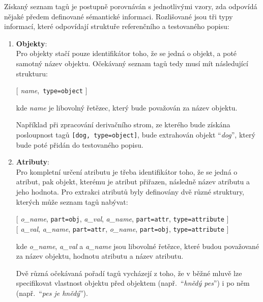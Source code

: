 Získaný seznam tagů je postupně porovnáván s jednotlivými vzory, zda odpovídá nějaké předem definované sémantické informaci.
Rozlišované jsou tři typy informací, které odpovídají struktuře referenčního a testovaného popisu:
\begin{enumerate}
	\item \textbf{Objekty}: \\
	      Pro objekty stačí pouze identifikátor toho, že se jedná o objekt, a poté samotný název objektu.
	      Očekávaný seznam tagů tedy musí mít následující strukturu:
	      \begin{center}
		      $\bigl[ $ \emph{name},\ {\texttt{type=object}} $\bigr]$
	      \end{center}
	      kde \emph{name} je libovolný řetězec, který bude považován za název objektu.

	      Například při zpracování derivačního strom, ze kterého bude získána posloupnost tagů
	      \texttt{[dog, type=object]},
	      bude extrahován objekt \enquote{\emph{dog}}, který bude poté přidán do testovaného popisu.
	\item \textbf{Atributy}: \\
	      Pro kompletní určení atributu je třeba identifikátor toho, že se jedná o atribut,
	      pak objekt, kterému je atribut přiřazen, následně název atributu a jeho hodnota.
	      Pro extrakci atributů byly definovány dvě různé struktury, kterých může seznam tagů nabývat:
	      \begin{center}
		      $\bigl[$ \emph{o\_name}, {\texttt{part=obj}}, \emph{a\_val}, \emph{a\_name},
					      {\texttt{part=attr}}, {\texttt{type=attribute}} $\bigr]$ \\
		      $\bigl[$ \emph{a\_val}, \emph{a\_name}, {\texttt{part=attr}}, \emph{o\_name},
					      {\texttt{part=obj}}, {\texttt{type=attribute}} $\bigr]$
	      \end{center}
	      kde \emph{o\_name}, \emph{a\_val} a \emph{a\_name} jsou libovolné řetězce, které budou považované za název objektu,
	      hodnotu atributu a název atributu.

	      Dvě různá očekávaná pořadí tagů vycházejí z toho, že v běžné mluvě lze specifikovat vlastnost objektu
	      před objektem (např.~\enquote{\emph{hnědý pes}}) i po něm (např.~\enquote{\emph{pes je hnědý}}).


\end{enumerate}
